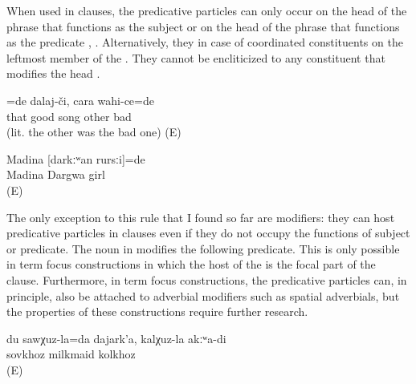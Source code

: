 When used in  clauses, the predicative particles can only occur on the head of the phrase that functions as the subject  or on the head of the phrase that functions as the  predicate , . Alternatively, they in case of coordinated constituents on the leftmost member of the  . They cannot be encliticized to any constituent that modifies the head . 

\begin{exe}
	\ex	\label{ex:‎The good one was a singer, not the bad one}
	\gll	[it	ʡaˁħ-ce]=de	dalaj-či,	cara	wahi-ce=de\\
		that	good	song	other	bad\\
	\glt	{} (lit. the other was the bad one) (E)

	\ex	\label{ex:‎‎‎Madina was a Dargwa girl}
	\begin{xlist}
		\ex	\label{ex:‎‎‎Madina was a Dargwa girl@A}
		\gll	Madina	[darkːʷan	rursːi]=de\\
			Madina	Dargwa	girl\\
		\glt	{} (E)

		 \label{ex:‎‎‎Madina was a Dargwa girl@B}
	\end{xlist}
\end{exe}

The only exception to this rule that I found so far are  modifiers: they can host predicative particles in  clauses even if they do not occupy the functions of  subject or  predicate. The  noun in  modifies the following  predicate. This is only possible in term focus constructions in which the host of the  is the focal part of the clause. Furthermore, in term focus constructions, the predicative particles can, in principle, also be attached to adverbial modifiers such as spatial adverbials, but the properties of these constructions require further research.

\begin{exe}
	\ex	\label{ex:‎I am milkmaid of the SOVKHOZ, not of the kolkhoz}
	\gll	du	sawχuz-la=da	dajark'a,	kalχuz-la	akːʷa-di\\
			sovkhoz	milkmaid	kolkhoz	\\
	\glt	{} (E)
\end{exe}

